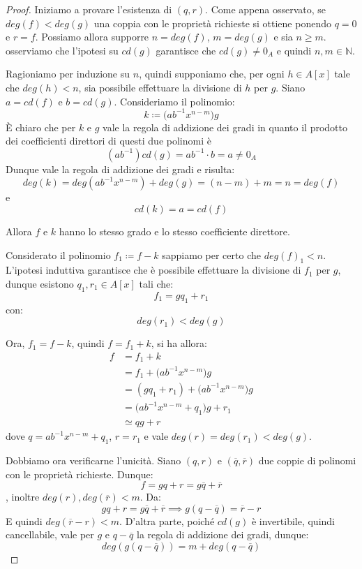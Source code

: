 \begin{proof}
	Iniziamo a provare l'esistenza di $(q,r)$. Come appena osservato, se $deg(f) < deg(g)$ una coppia con le proprietà richieste si ottiene ponendo $q=0$ e $r=f$. Possiamo allora supporre $n = deg(f)$,  $m = deg(g)$ e sia $n\geq m$. osserviamo che l'ipotesi su $cd(g)$ garantisce che $cd(g) \neq 0_{A}$ e quindi $n,m \in \mathbb{N}$. 
	
	Ragioniamo per induzione su $n$, quindi supponiamo che, per ogni $h \in A[x]$ tale che $deg(h) < n$, sia possibile effettuare la divisione di $h$ per $g$. Siano $a=cd(f)$ e $b = cd(g)$. Consideriamo il polinomio: $$k \coloneqq \bigl(ab^{-1}x^{n-m}\bigr)g$$
	È chiaro che per $k$ e $g$ vale la regola di addizione dei gradi in quanto il prodotto dei coefficienti direttori di questi due polinomi è $$(ab^{-1})cd(g)=ab^{-1}\cdot b = a \neq 0_{A}$$
	Dunque vale la regola di addizione dei gradi e risulta:
	\begin{displaymath}
		deg(k) = deg (ab^{-1}x^{n-m})+ deg(g) = (n-m)+m=n = deg(f)
	\end{displaymath}
	e $$cd(k)= a = cd(f)$$
	
	Allora $f$ e $k$ hanno lo stesso grado e lo stesso coefficiente direttore. 
	
	Considerato il polinomio $f_{1} \coloneqq f-k$ sappiamo per certo che $deg(f)_{1} < n$. L'ipotesi induttiva garantisce che è possibile effettuare la divisione di $f_{1}$ per $g$, dunque esistono $q_{1},r_{1} \in A[x]$ tali che: $$f_{1}=gq_{1}+r_{1}$$ con: $$deg(r_{1}) < deg(g)$$
	
	Ora, $f_{1}=f-k$, quindi $f=f_{1}+k$, si ha allora:
	\begin{align*}
		f &=f_{1}+k \\
		&= f_{1} + \bigl(ab^{-1}x^{n-m}\bigr)g \\
		&= (g q_{1} + r_{1}) + \bigl(ab^{-1}x^{n-m}\bigr)g \\
		&= \bigl(ab^{-1}x^{n-m}+q_{1}\bigr) g + r_{1} \\
		&\simeq qg+r
	\end{align*}
	dove $q= ab^{-1}x^{n-m}+q_{1}$, $r= r_{1}$ e vale $deg (r) = deg (r_{1}) < deg(g)$.
	
	Dobbiamo ora verificarne l'unicità. Siano $(q,r)$ e $(\overline{q},\overline{r})$ due coppie di polinomi con le proprietà richieste. Dunque: $$f=gq+r = g \overline{q}+\overline{r}$$, inoltre $deg (r), deg (\overline{r}) < m$. Da:
	\begin{displaymath}
		gq+r = g \overline{q}+\overline{r} \implies g(q-\overline{q})=\overline{r}-r
	\end{displaymath}
	E quindi $deg (\overline{r}-r) < m$. D'altra parte, poiché $cd(g) $ è invertibile, quindi cancellabile, vale per $g$ e $q-\overline{q}$ la regola di addizione dei gradi, dunque: $$deg (g(q-\overline{q}))=m+deg (q-\overline{q})$$ 
	

\end{proof}
